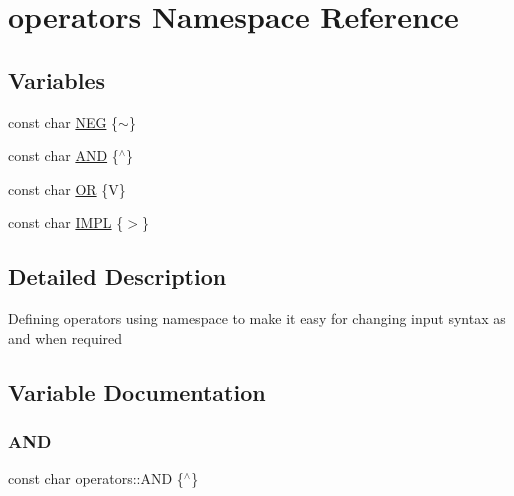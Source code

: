 \hypertarget{namespaceoperators}{}\section{operators Namespace Reference}
\label{namespaceoperators}
\subsection*{Variables}
\begin{DoxyCompactItemize}
\item 
const char \hyperlink{namespaceoperators_abc0d09c09b437de98007962a590ea557}{N\+EG} \{\textquotesingle{}$\sim$\textquotesingle{}\}
\item 
const char \hyperlink{namespaceoperators_aff9dc11d489d31278c1e3f90ae09dd9b}{A\+ND} \{\textquotesingle{}$^\wedge$\textquotesingle{}\}
\item 
const char \hyperlink{namespaceoperators_a1f469207e0d08770fc7bbac128cfd845}{OR} \{\textquotesingle{}V\textquotesingle{}\}
\item 
const char \hyperlink{namespaceoperators_a40fe490f326324304d4529854fb2deea}{I\+M\+PL} \{\textquotesingle{}$>$\textquotesingle{}\}
\end{DoxyCompactItemize}


\subsection{Detailed Description}
Defining operators using namespace to make it easy for changing input syntax as and when required 

\subsection{Variable Documentation}
\mbox{\label{namespaceoperators_aff9dc11d489d31278c1e3f90ae09dd9b}} 
\subsubsection{\texorpdfstring{A\+ND}{AND}}
{\footnotesize\ttfamily const char operators\+::\+A\+ND \{\textquotesingle{}$^\wedge$\textquotesingle{}\}}

\mbox{\label{namespaceoperators_a40fe490f326324304d4529854fb2deea}} 
